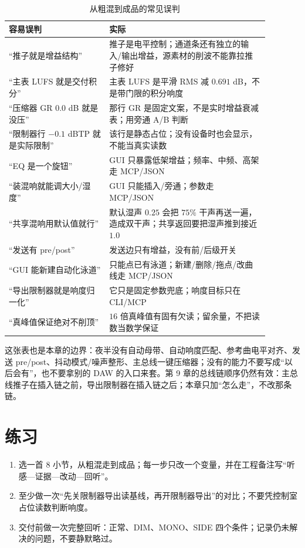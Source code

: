 \begin{table}[htbp]
\centering
\small
\begin{tabular}{@{}p{0.34\linewidth}p{0.54\linewidth}@{}}
\hline
容易误判 & 实际 \\
\hline
“推子就是增益结构” & 推子是电平控制；通道条还有独立的输入/输出增益，源素材的削波不能靠拉推子修好 \\
“主表 LUFS 就是交付积分” & 主表 LUFS 是平滑 RMS 减 $0.691$ dB，不是带门限的积分响度 \\
“压缩器 GR 0.0 dB 就是没压” & 那行 GR 是固定文案，不是实时增益衰减表；用旁通 A/B 判断 \\
“限制器行 $-0.1$ dBTP 就是实际限制” & 该行是静态占位；没有设备时也会显示，不能当真实读数 \\
“EQ 是一个旋钮” & GUI 只暴露低架增益；频率、中频、高架走 MCP/JSON \\
“装混响就能调大小/湿度” & GUI 只能插入/旁通；参数走 MCP/JSON \\
“共享混响用默认值就行” & 默认湿声 $0.25$ 会把 $75\%$ 干声再送一遍，造成双干声；共享返回要把湿声推到接近 $1.0$ \\
“发送有 pre/post” & 发送边只有增益，没有前/后级开关 \\
“GUI 能新建自动化泳道” & 只能点已有泳道；新建/删除/拖点/改曲线走 MCP/JSON \\
“导出限制器就是响度归一化” & 它只是固定参数兜底；响度目标只在 CLI/MCP \\
“真峰值保证绝对不削顶” & $16$ 倍真峰值有固有欠读；留余量，不把读数当数学保证 \\
\hline
\end{tabular}
\caption{从粗混到成品的常见误判}
\label{tab:walk-pitfalls}
\end{table}

这张表也是本章的边界：夜半没有自动母带、自动响度匹配、参考曲电平对齐、发送 pre/post、抖动模式/噪声整形、主总线一键压缩器；没有的能力不要写成“以后会有”，也不要拿别的 DAW 的入口来套。第 9 章的总线链顺序仍然有效：主总线推子在插入链之前，导出限制器在插入链之后；本章只加“怎么走”，不改那条链。

\section{练习}


\begin{exercise}
\begin{enumerate}
  \item 选一首 8 小节，从粗混走到成品；每一步只改一个变量，并在工程备注写“听感—证据—改动—回听”。
  \item 至少做一次“先关限制器导出读基线，再开限制器导出”的对比；不要凭控制室占位读数判断响度。
  \item 交付前做一次完整回听：正常、DIM、MONO、SIDE 四个条件；记录仍未解决的问题，不要静默略过。
\end{enumerate}
\end{exercise}

